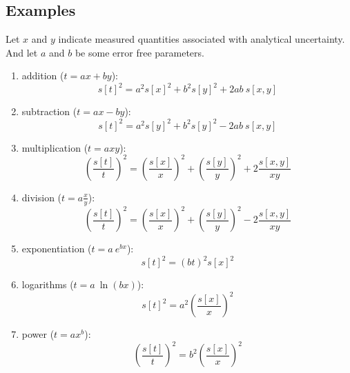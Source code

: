 \documentclass{article}
\begin{document}
\begin{multicols}{3}
\subsection{Examples}

Let $x$ and $y$ indicate measured quantities associated with
analytical uncertainty.  And let $a$ and $b$ be some error free
parameters.
\begin{enumerate}
\item{addition ($t = a x + b y$):}
\begin{equation}
  s[t]^2 = a^2 s[x]^2 + b^2 s[y]^2 + 2ab~s[x,y]
  \label{eq:addition}
\end{equation}

\item{subtraction ($t = a x - b y$):}
\begin{equation}
s[t]^2 = a^2 s[y]^2 + b^2 s[y]^2 - 2ab~s[x,y]
\label{eq:subtraction}
\end{equation}

\item{multiplication ($t = a x y$):}
\begin{equation}
\left(\frac{s[t]}{t}\right)^2 = \left(\frac{s[x]}{x}\right)^2 + 
  \left(\frac{s[y]}{y}\right)^2 + 2 \frac{s[x,y]}{x y}
\label{eq:multiplication}
\end{equation}

\item{division ($t = a \frac{x}{y}$):}
\begin{equation}
  \left(\frac{s[t]}{t}\right)^2 = \left(\frac{s[x]}{x}\right)^2 + 
  \left(\frac{s[y]}{y}\right)^2 - 2 \frac{s[x,y]}{x y}
\label{eq:division}
\end{equation}

\item{exponentiation ($t = a~e^{bx}$):}
\begin{equation}
s[t]^2 = (b t)^2 s[x]^2
\label{eq:exponentiation}
\end{equation}

\item{logarithms ($t = a~\ln(bx)$):}
\begin{equation}
s[t]^2 = a^2 \left(\frac{s[x]}{x}\right)^2
\label{eq:logarithms}
\end{equation}

\item{power ($t = a x^b$):}
\begin{equation}
\left(\frac{s[t]}{t}\right)^2 = b^2\left(\frac{s[x]}{x}\right)^2
\label{eq:power}
\end{equation}


\end{enumerate}
\end{multicols}
\end{document}
